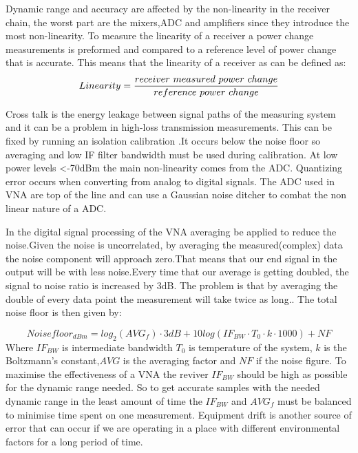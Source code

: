 Dynamic range and accuracy are affected by the non-linearity in the receiver chain, the worst part are the mixers,\gls{ADC} and amplifiers since they introduce the most non-linearity. To measure the linearity of a receiver a power change measurements is preformed and compared to a reference level of power change that is accurate. This means that the linearity of a receiver as can be defined as:
\begin{equation}
Linearity = \frac{receiver \\\ measured \\\ power \\\ change}{reference \ power \ change}
\label{Linearity}
\end{equation}
 

Cross talk is the energy leakage between signal paths of the measuring system and it can be a problem in high-loss transmission measurements. This can be fixed by running an isolation calibration \citep{crosstalk}.It occurs below the noise floor so averaging and low \gls{IF} filter bandwidth must be used during calibration.
At low power levels <-70dBm the main non-linearity comes from the \gls{ADC}. Quantizing error occurs when converting from analog to digital signals. The \gls{ADC} used in \gls{VNA} are top of the line and can use a Gaussian noise ditcher to combat the non linear nature of a \gls{ADC}. 


In the digital signal processing of the \gls{VNA} averaging be applied to reduce the noise.Given the noise is uncorrelated, by averaging the measured(complex) data the noise component will approach zero.That means that our end signal in the output will be with less noise.Every time that our average is getting doubled, the signal to noise ratio is increased by 3dB. The problem is that by averaging the double of every data point the measurement will take twice as long.\citep{KeysightAVG}. The total noise floor is then given by:

\begin{equation}
Noisefloor_{dBm} = log_{2}(AVG_f)\cdot 3dB +10log(IF_{BW}\cdot T_{0}\cdot k\cdot 1000) + NF 
\label{NFwithAVG}
\end{equation}
Where $IF_{BW}$ is  intermediate bandwidth $T_0$ is temperature of the system, $k$ is the Boltzmann's constant,$AVG$ is the averaging factor and $NF$ if the noise figure.
To maximise the effectiveness of a \gls{VNA} the reviver $IF_{BW}$ should be high as possible for the dynamic range needed. So to get accurate samples with the needed dynamic range in the least amount of time the $IF_{BW}$ and $AVG_f$ must be balanced to minimise time spent on one measurement.
Equipment drift is another source of error that can occur if we are operating in a place with different environmental factors for a long period of time.



